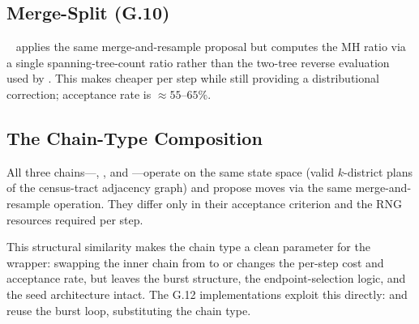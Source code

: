 \subsection{Merge-Split (G.10)}
\label{subsec:background-ms}

\ms{}~\citep{janson2022,g10paper} applies the same merge-and-resample proposal
but computes the MH ratio via a single spanning-tree-count ratio rather than
the two-tree reverse evaluation used by \frecom{}.
This makes \ms{} cheaper per step while still providing a distributional
correction; acceptance rate is $\approx 55$--$65\%$.

\subsection{The Chain-Type Composition}
\label{subsec:background-composition}

All three chains---\recom{}, \frecom{}, and \ms{}---operate on the same
state space (valid $k$-district plans of the census-tract adjacency graph)
and propose moves via the same merge-and-resample operation.
They differ only in their acceptance criterion and the RNG resources required
per step.

This structural similarity makes the chain type a clean parameter for the
\sburst{} wrapper: swapping the inner chain from \recom{} to \frecom{} or
\ms{} changes the per-step cost and acceptance rate, but leaves the burst
structure, the endpoint-selection logic, and the seed architecture intact.
The G.12 implementations exploit this directly: \sbf{} and \sbms{} reuse
the \sburst{} burst loop, substituting the chain type.
